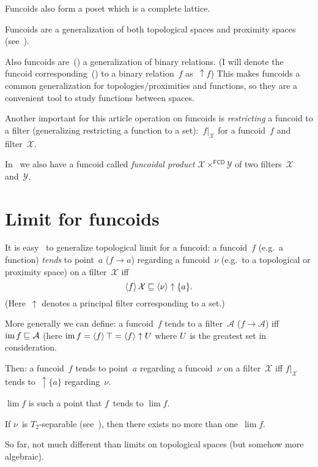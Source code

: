 Funcoids also form a poset which is a complete lattice.

Funcoids are a generalization of both topological spaces and proximity spaces (see~\cite{volume-1-edition1}).

Also funcoids are~(\cite{volume-1-edition1}) a generalization of binary relations. (I will denote the funcoid corresponding~(\cite{volume-1-edition1}) to a binary relation~$f$ as~$\uparrow f$) This makes funcoids a common generalization for topologies/proximities and functions, so they are a convenient tool to study functions between spaces.

Another important for this article operation on funcoids is \emph{restricting} a funcoid to a filter (generalizing restricting a function to a set):~$f|_{\mathcal{X}}$ for a funcoid~$f$ and filter~$\mathcal{X}$.

In~\cite{volume-1-edition1} we also have a funcoid called \emph{funcoidal product} $\mathcal{X}\times^{\mathsf{FCD}}\mathcal{Y}$ of two filters~$\mathcal{X}$ and~$\mathcal{Y}$.

\chapter{Limit for funcoids}

It is easy~\cite{volume-1-edition1} to generalize topological limit for a funcoid: a funcoid~$f$ (e.g.\ a function) \emph{tends} to point~$a$ ($f\to a$) regarding a funcoid~$\nu$ (e.g.\ to a topological or proximity space) on a filter~$\mathcal{X}$ iff
\[ \left\langle f\right\rangle\mathcal{X} \sqsubseteq \left\langle \nu\right\rangle\uparrow\{a\}. \]
(Here~$\uparrow$ denotes a principal filter corresponding to a set.)

More generally we can define: a funcoid~$f$ tends to a filter~$\mathcal{A}$ ($f\to\mathcal{A}$) iff $\operatorname{im} f\sqsubseteq\mathcal{A}$ (here $\operatorname{im} f = \left\langle f\right\rangle\top = \left\langle f\right\rangle\uparrow U$ where $U$~is the greatest set in consideration.

Then: a funcoid~$f$ tends to point~$a$ regarding a funcoid~$\nu$ on a filter~$\mathcal{X}$ iff $f|_{\mathcal{X}}$ tends to~$\uparrow\{a\}$ regarding~$\nu$.

$\lim f$ is such a point that $f$~tends to $\lim f$.

If $\nu$~is $T_2$-separable (see~\cite{volume-1-edition1}), then there exists no more than one~$\lim f$.

So far, not much different than limits on topological spaces (but somehow more algebraic).

